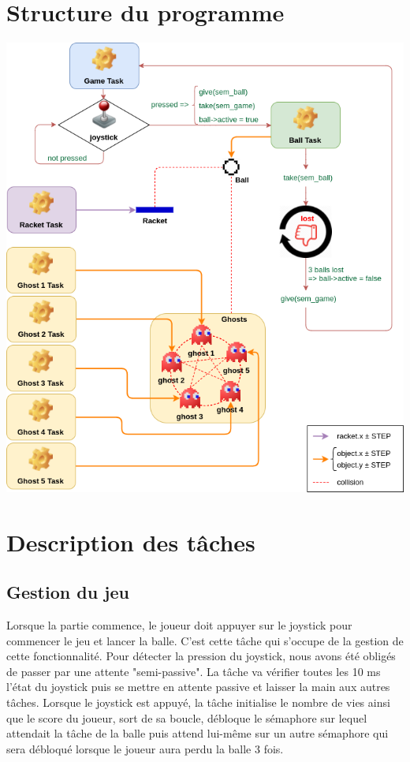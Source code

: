 \documentclass[a4paper]{article}
\begin{document}
\section{Structure du programme}
\begin{center}
\includegraphics[scale=0.6]{images/ghostbusters.png}
\end{center}

\section{Description des tâches}
\subsection{Gestion du jeu}
Lorsque la partie commence, le joueur doit appuyer sur le joystick pour
commencer le jeu et lancer la balle. C'est cette tâche qui s'occupe de la
gestion de cette fonctionnalité. Pour détecter la pression du joystick, nous avons
été obligés de passer par une attente "semi-passive". La tâche va vérifier toutes
les 10 ms l'état du joystick puis se mettre en attente passive et laisser la main
aux autres tâches. Lorsque le joystick est appuyé, la tâche initialise le nombre
de vies ainsi que le score du joueur, sort de sa boucle, débloque le sémaphore
sur lequel attendait la tâche de la balle puis attend lui-même sur un autre
sémaphore qui sera débloqué lorsque le joueur aura perdu la balle 3 fois.
\end{document}
